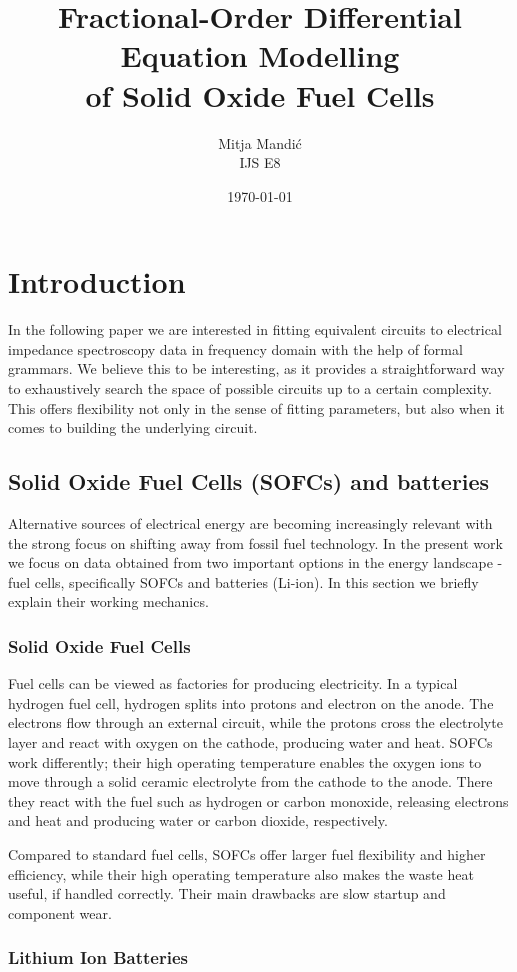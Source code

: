 \documentclass[
    11pt,
    a4paper,
    oneside
]{article}
\title{
    \textbf{Fractional-Order Differential Equation Modelling\\
    of Solid Oxide Fuel Cells}
}
\author{
    Mitja Mandić\\
    \small IJS E8
}
\date{\today}
\begin{document}
\section{Introduction}

In the following paper we are interested in fitting equivalent circuits to electrical impedance spectroscopy data in frequency domain with the help of formal grammars. We believe this
to be interesting, as it provides a straightforward way to exhaustively search the space of possible circuits up to a certain complexity. This offers flexibility not only
in the sense of fitting parameters, but also when it comes to building the underlying circuit.

\subsection{Solid Oxide Fuel Cells (SOFCs) and batteries}

Alternative sources of electrical energy are becoming increasingly relevant with the strong focus on shifting away from fossil fuel technology. In the present work we focus on data obtained
from two important options in the energy landscape - fuel cells, specifically SOFCs and batteries (Li-ion). In this section we briefly explain their working mechanics.

\subsubsection{Solid Oxide Fuel Cells}

Fuel cells can be viewed as factories for producing electricity. In a typical hydrogen fuel cell, hydrogen splits into protons and electron on the anode. The electrons
flow through an external circuit, while the protons cross the electrolyte layer and react with oxygen on the cathode, producing water and heat. SOFCs work differently; 
their high operating temperature enables the oxygen ions to move through a solid ceramic electrolyte from the cathode to the anode. There they react with the fuel such as hydrogen or carbon monoxide,
releasing electrons and heat and producing water or carbon dioxide, respectively.

Compared to standard fuel cells, SOFCs offer larger fuel flexibility and higher efficiency, while their high operating temperature also makes the waste heat useful, if handled correctly. Their main
drawbacks are slow startup and component wear. \cite{OHayre2016FuelCellFundamentals}

\subsubsection{Lithium Ion Batteries}
\end{document}

